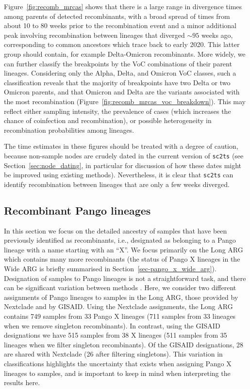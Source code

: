 \documentclass{article}
\begin{document}
Figure~\ref{fig:recomb_mrcas} shows that there is a
large range in divergence times among parents of detected recombinants, with a broad
spread of times from about 10 to 80 weeks prior to the recombination event
and a minor additional peak involving recombination between lineages that diverged
${\sim}95$ weeks ago, corresponding to common ancestors which trace back to early 2020.
This latter group should
contain, for example Delta-Omicron recombinants. More widely, we can
further classify the breakpoints by the VoC combinations of their
parent lineages. Considering only the Alpha, Delta, and Omicron VoC classes,
such a classification reveals that the majority of breakpoints have two Delta or
two Omicron parents, and that Omicron and Delta are the variants associated
with the most recombination (Figure~\ref{fig:recomb_mrcas_voc_breakdown}).
This may reflect either sampling intensity, the
prevalence of cases (which increases the
chance of coinfection and recombination), or possible heterogeneity in
recombination probabilities among lineages.

The time estimates in these figures should be
treated with a degree of caution,
because non-sample nodes are crudely dated in the current version
of \texttt{sc2ts} (see Section~\ref{sec:node_dating}, in particular
for discussion of how these dates might be improved using existing
methods).
Nevertheless, it is clear
that \texttt{sc2ts} can identify recombination between lineages
that are only a few weeks diverged.

\subsection{Recombinant Pango lineages}
\label{sec:pango_x_lineages}
In this section we focus on the detailed ancestry of samples that have been
previously identified as recombinants, i.e., designated as belonging
to a Pango lineage with a name starting with an ``X''.
We focus primarily on the Long ARG
which contains many more recombinants (the status
of Pango X lineages in the Wide ARG is briefly
summarised in Section~\ref{sec-pango_x_wide_arg}).
Designation of samples to Pango lineages is not a straightforward task,
and there can be significant variation between methods \citep{deBernardiSchneider2023-sars}.
Here, we consider two different assignments of Pango lineages to samples in
the Long ARG, those provided by Nextclade and by GISAID.
Using the Nextclade assignments, the Long ARG contains 749 samples from
33 Pango X lineages (711 samples from 33 lineages when we
remove singleton recombinants).
In contrast, using the GISAID designations we
have 515 samples from 38 X lineages
(511 samples from 35 lineages when we filter singleton recombinants). Of the GISAID designations,
28 are shared with Nextclade (26 after filtering singletons).
This variation in classifications highlights the uncertainty that exists when
assigning Pango X lineages to samples, and is important to keep in mind
when interpreting the results here.
\end{document}
